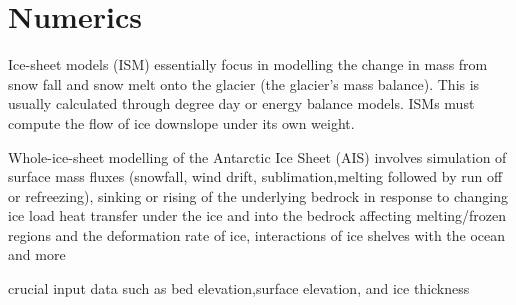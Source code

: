 \chapter{Numerics}

Ice-sheet models (ISM) essentially focus in modelling the change in mass from snow fall and snow melt onto the glacier (the glacier’s mass balance). This is usually calculated through degree day or energy balance models. ISMs must compute the flow of ice downslope under its own weight\cite{WinNT}. 

Whole-ice-sheet modelling of the Antarctic Ice Sheet (AIS) involves simulation of surface mass
fluxes (snowfall, wind drift, sublimation,melting followed by run off or refreezing), sinking or rising of the underlying bedrock in response to changing ice load heat transfer under the ice and into the bedrock affecting melting/frozen regions and the deformation rate of ice, interactions of ice shelves with the ocean and more\cite{Huybrechts_2007}

crucial input data such as bed elevation,surface elevation, and ice thickness\cite{Huybrechts_2007}





